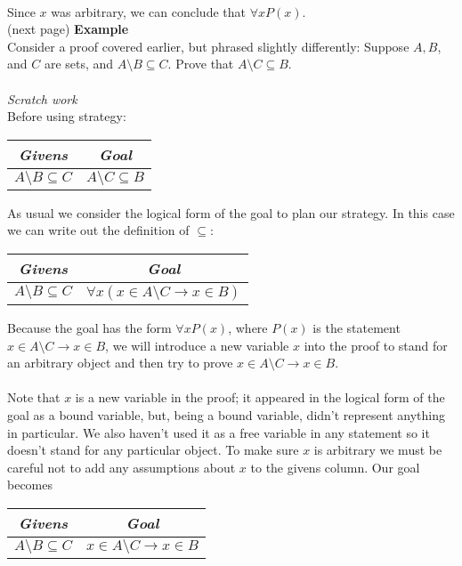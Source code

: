 \documentclass{report}
\begin{document}
\indent{}\\
\indent Since $x$ was arbitrary, we can conclude that $\forall xP(x)$.\\
(next page)\newpage
\noindent\textbf{Example}\\
Consider a proof covered earlier, but phrased slightly differently: Suppose $A,B$, and $C$ are sets, and $A\setminus B\subseteq C$. Prove that $A\setminus C\subseteq B$.\\
\vspace{1mm}\\
\textit{Scratch work}\\
Before using strategy:
\begin{center}
\begin{tabular}{c|c}
\textit{Givens}&\textit{Goal}\\
\hline
$A\setminus B\subseteq C$&$A\setminus C\subseteq B$
\end{tabular}
\end{center}
As usual we consider the logical form of the goal to plan our strategy. In this case we can write out the definition of $\subseteq$:
\begin{center}
\begin{tabular}{c|c}
\textit{Givens}&\textit{Goal}\\
\hline
$A\setminus B\subseteq C$&$\forall x(x\in A\setminus C\to x\in B)$
\end{tabular}
\end{center}
Because the goal has the form $\forall xP(x)$, where $P(x)$ is the statement $x\in A\setminus C\to x\in B$, we will introduce a new variable $x$ into the proof to stand for an arbitrary object
and then try to prove $x\in A\setminus C\to x\in B$.\\
\vspace{1mm}\\
Note that $x$ is a new variable in the proof; it appeared in the logical form of the goal as a bound variable, but, being a bound variable, didn't represent anything in particular. 
We also haven't used it as a free variable in any statement so it doesn't stand for any particular object. To make sure $x$ is arbitrary we must be careful not to add any assumptions
about $x$ to the givens column. Our goal becomes
\begin{center}
\begin{tabular}{c|c}
\textit{Givens}&\textit{Goal}\\
\hline
$A\setminus B\subseteq C$&$x\in A\setminus C\to x\in B$
\end{tabular}
\end{center}
\end{document}
